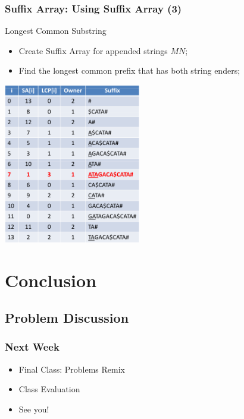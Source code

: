 \documentclass{beamer}
\begin{document}
\begin{frame}
    \frametitle{Suffix Array: Using Suffix Array (3)}
  {\smaller
    \begin{block}{Longest Common Substring}
      \begin{itemize}
      \item Create Suffix Array for appended strings $MN$;
      \item Find the longest common prefix that has both string enders;
      \end{itemize}
    \end{block}
    \begin{center}
      \includegraphics[width=0.45\textwidth]{../img/suffixarray3_halim}
    \end{center}
  }
\end{frame}

\section{Conclusion}

\subsection{Problem Discussion}


\begin{frame}
  \frametitle{Next Week}
  \begin{itemize}
  \item Final Class: Problems Remix
  \item Class Evaluation
  \item See you!
  \end{itemize}
\end{frame}
\end{document}
